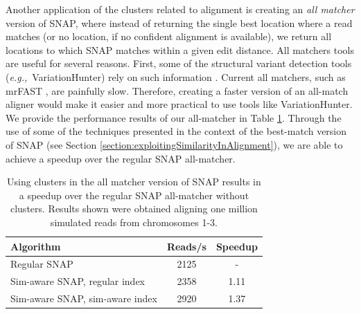 \documentclass[twocolumn,10pt]{article}
\newcommand{\eg}{{\em e.g.,}~}
\begin{document}

Another application of the clusters related to alignment is creating an \textit{all matcher} version of SNAP, where instead of returning the single best location where a read matches (or no location, if no confident alignment is available), we return all locations to which SNAP matches within a given edit distance.  All matchers tools are useful for several reasons.  First, some of the structural variant detection tools (\eg VariationHunter) rely on such information \cite{Hormozdiari:2009}.  Current all matchers, such as mrFAST \cite{Alkan:2009}, are painfully slow.  %
Therefore, creating a faster version of an all-match aligner would make it easier and more practical to use tools like VariationHunter.
We provide the performance results of our all-matcher in Table \ref{table:allMatcher}.  Through the use of some of the techniques presented in the context of the best-match version of SNAP (see Section \ref{section:exploitingSimilarityInAlignment}), we are able to achieve a speedup over the regular SNAP all-matcher.

\begin{table}
\centering
\begin{tabular}{| l || c | c |}
\hline
\vrule height 10pt depth 0pt width 0pt \textbf{Algorithm} & \textbf{Reads/s} & \textbf{Speedup}\\
\hline
\vrule height 10pt depth 0pt width 0pt Regular SNAP & 2125 & -\\
\hline
\vrule height 10pt depth 0pt width 0pt Sim-aware SNAP, regular index & 2358 & 1.11\\
\hline
\vrule height 10pt depth 0pt width 0pt Sim-aware SNAP, sim-aware index & 2920 & 1.37\\
\hline
\end{tabular}
\caption{Using clusters in the all matcher version of SNAP results in a speedup over the regular SNAP all-matcher without clusters.  Results shown were obtained aligning one million simulated reads from chromosomes 1-3.}
\label{table:allMatcher}
\end{table}
\end{document}
